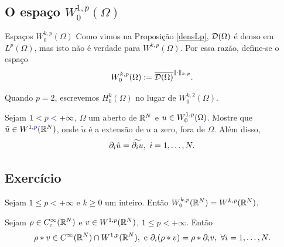 \subsection*{O espaço \texorpdfstring{\(W_0^{1,p}(\Omega)\)}{W₀¹ 𞀾(Ω)}}

\begin{frame}{Espaços $W_0^{k,p}(\Omega)$}
Como vimos na Proposição \ref{densLp}, $\mathcal{D}(\Omega)$ é denso em $L^p(\Omega)$, mas isto não é verdade para $W^{k,p}(\Omega)$. Por essa razão, define-se o espaço 
\[W_0^{k,p}(\Omega):=\overline{\mathcal{D}(\Omega)}^{\|\cdot\|_{k,p}}.\]

Quando $p=2$, escrevemos $H_0^k(\Omega)$ no lugar de $W^{k,2}_0(\Omega)$. 

\begin{exer}
Sejam \(1<{\color{blue} p }<+\infty\),  \(\Omega\) um aberto de \(\mathbb{R}^N\) e \(u\in W_0^{1,{\color{blue} p }}(\Omega)\). Mostre que \(\tilde{u}\in W^{1,{\color{blue} p }}(\mathbb{R}^N)\), onde  \(\tilde{u}\) é a extensão de \(u\) a zero, fora de \(\Omega\). Além disso, 
\[
\partial_i \tilde{u}=\widetilde{\partial_i u},\ i=1,\ldots, N.
\]
\end{exer}
\subsection*{Exercício \theexer}
\end{frame}

\begin{frame}

\begin{prop}
 Sejam $1\leq p<+\infty$ e $k\geq 0$ um inteiro. Então $W_0^{k,p}(\mathbb{R}^N)=W^{k,p}(\mathbb{R}^N)$.
\end{prop}

\begin{lemaaux}
	Sejam $\rho\in C_c^\infty(\mathbb{R}^N)$ e $v\in W^{1,p}(\mathbb{R}^N)$, $1\leq p< +\infty$. Então 
	\[\rho\ast v\in C^\infty(\mathbb{R}^N) \cap W^{1,p}(\mathbb{R}^N), \text{ e } \partial_i(\rho\ast v)=\rho\ast \partial_i v,\  \forall i=1,\ldots,N.\]
\end{lemaaux}
\end{frame}
